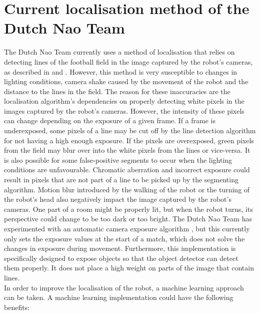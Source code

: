 \documentclass{uva-inf-bachelor-thesis}
\begin{document}
     \section{Current localisation method of the Dutch Nao Team}
        The Dutch Nao Team currently uses a method of localisation that relies on detecting lines of the football field in the image captured by the robot's cameras, as described in \cite{DNT2018} and \cite{dnt2020}. However, this method is very susceptible to changes in lighting conditions, camera shake caused by the movement of the robot and the distance to the lines in the field.
        The reason for these inaccuracies are the localisation algorithm's dependencies on properly detecting white pixels in the images captured by the robot's cameras. However, the intensity of these pixels can change depending on the exposure of a given frame. If a frame is underexposed, some pixels of a line may be cut off by the line detection algorithm for not having a high enough exposure. If the pixels are overexposed, green pixels from the field may blur over into the white pixels from the lines or vice-versa. It is also possible for some false-positive segments to occur when the lighting conditions are unfavourable. Chromatic aberration and incorrect exposure could result in pixels that are not part of a line to be picked up by the segmenting algorithm.
        Motion blur introduced by the walking of the robot or the turning of the robot's head also negatively impact the image captured by the robot's cameras. One part of a room might be properly lit, but when the robot turns, its perspective could change to be too dark or too bright. The Dutch Nao Team has experimented with an automatic camera exposure algorithm \cite{dnt2022}, but this currently only sets the exposure values at the start of a match, which does not solve the changes in exposure during movement. Furthermore, this implementation is specifically designed to expose objects so that the object detector can detect them properly. It does not place a high weight on parts of the image that contain lines. 
        \hfill \break \\
        In order to improve the localisation of the robot, a machine learning approach can be taken. A machine learning implementation could have the following benefits:
\end{document}
